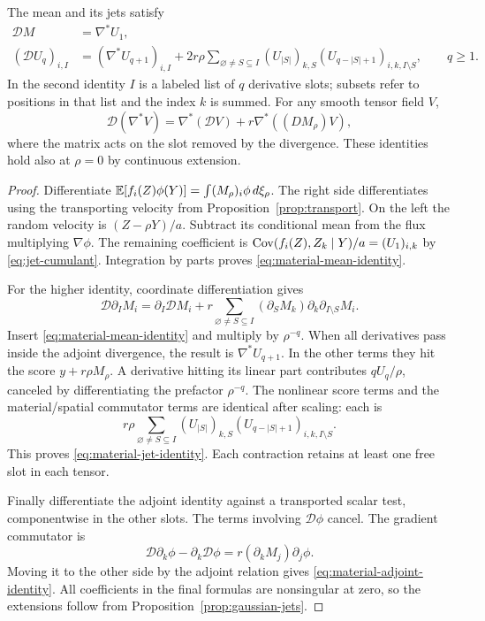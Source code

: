 \begin{lemma}
\label{lem:material-identities}
The mean and its jets satisfy
\begin{align}
 \mathcal D M&=\nabla^*U_1,
 \label{eq:material-mean-identity}\\
 (\mathcal D U_q)_{i,I}
 &= (\nabla^*U_{q+1})_{i,I}
   +2r\rho\sum_{\varnothing\ne S\subseteq I}
       (U_{|S|})_{k,S}
       (U_{q-|S|+1})_{i,k,I\setminus S},\qquad q\ge1.
 \label{eq:material-jet-identity}
\end{align}
In the second identity $I$ is a labeled list of $q$ derivative slots;
subsets refer to positions in that list and the index $k$ is summed.
For any smooth tensor field $V$,
\begin{equation}
 \mathcal D(\nabla^*V)
 =\nabla^*(\mathcal DV)
   +r\nabla^*((DM_\rho)V),
 \label{eq:material-adjoint-identity}
\end{equation}
where the matrix acts on the slot removed by the divergence.  These
identities hold also at $\rho=0$ by continuous extension.
\end{lemma}

\begin{proof}
Differentiate
$\mathbb E[f_i(Z)\phi(Y)]=\int (M_\rho)_i\phi\,d\xi_\rho$.
The right side differentiates using the transporting velocity from
Proposition~\ref{prop:transport}.  On the left the random velocity is
$(Z-\rho Y)/a$.  Subtract its conditional mean from the flux multiplying
$\nabla\phi$.  The remaining coefficient is
$\operatorname{Cov}(f_i(Z),Z_k\mid Y)/a=(U_1)_{i,k}$ by
\eqref{eq:jet-cumulant}.  Integration by parts proves
\eqref{eq:material-mean-identity}.

For the higher identity, coordinate differentiation gives
\[
 \mathcal D\partial_I M_i
 =\partial_I\mathcal DM_i
 +r\sum_{\varnothing\ne S\subseteq I}
       (\partial_SM_k)\partial_k\partial_{I\setminus S}M_i.
\]
Insert \eqref{eq:material-mean-identity} and multiply by $\rho^{-q}$.
When all derivatives pass inside the adjoint divergence, the result
is $\nabla^*U_{q+1}$.  In the other terms they hit the score
$y+r\rho M_\rho$.  A derivative hitting its linear part contributes
$qU_q/\rho$, canceled by differentiating the prefactor $\rho^{-q}$.
The nonlinear score terms and the material/spatial commutator terms
are identical after scaling: each is
\[
 r\rho\sum_{\varnothing\ne S\subseteq I}
       (U_{|S|})_{k,S}(U_{q-|S|+1})_{i,k,I\setminus S}.
\]
This proves \eqref{eq:material-jet-identity}.  Each contraction retains
at least one free slot in each tensor.

Finally differentiate the adjoint identity against a transported
scalar test, componentwise in the other slots.  The terms involving
$\mathcal D\phi$ cancel.  The gradient commutator is
\[
 \mathcal D\partial_k\phi-\partial_k\mathcal D\phi
 =r(\partial_kM_j)\partial_j\phi.
\]
Moving it to the other side by the adjoint relation gives
\eqref{eq:material-adjoint-identity}.  All coefficients in the final
formulas are nonsingular at zero, so the extensions follow from
Proposition~\ref{prop:gaussian-jets}.
\end{proof}

